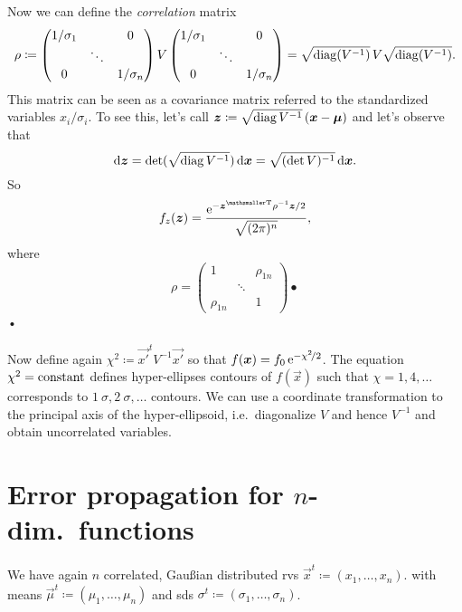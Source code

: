 Now we can define the \emph{correlation} matrix
\begin{equation}
	\rho\coloneqq 
	\begin{pmatrix}
		1/\sigma_1 & &0\\
			 &\ddots & \\
		0 & &1/\sigma_n
	\end{pmatrix}
	V
	\begin{pmatrix}
		1/\sigma_1 & &0\\
			 &\ddots & \\
		0 & &1/\sigma_n
	\end{pmatrix}
	= \sqrt{\operatorname{diag} (V^{-1}) }\, V \sqrt{\operatorname{diag} (V^{-1})}.
\end{equation}
This matrix can be seen as a covariance matrix referred to the standardized variables $x_i/\sigma_i$.
To see this, let's call $\bm{{z}} \coloneqq \sqrt{\operatorname{diag} V^{-1}}\,(\bm{{x}}-\bm{{\mu}})$ and let's observe that
\begin{equation}
	\mathop{}\!\mathrm{d}\bm{{z}} = \det(\sqrt{\operatorname{diag} V^{-1} })\mathop{}\!\mathrm{d}\bm{{x}} = \sqrt{(\det V)^{-1}}\mathop{}\!\mathrm{d} \bm{{x}}.
\end{equation}
So
\begin{equation}
	f_z(\vec{z}) = \frac{\eu^{-\transpose{\vec{z}} \rho ^{-1} \vec{z}/2}}{\sqrt{(2\pi)^n}},
\end{equation}
where
\begin{equation}
	\rho =
	\begin{pmatrix}
		1	& 	&\rho_{1n} \\
	   &\ddots{} 	 & \\
		\rho_{1n}	&  &1
	\end{pmatrix}•
\end{equation}•



Now define again $\chi^2 \coloneqq\vec{x'}^tV^{-1}\vec{x'}$ so that $f(\bm{{x}}) = f_0\,\mathrm{e}^{-\chi^2\!/2}$.
The equation $\chi^2 = \textup{constant}$ defines hyper-ellipses contours of $f(\vec{x})$ such that $\chi = 1,4,\dots$ corresponds to $\SI{1}{\sigma},\SI{2}{\sigma},\dots$ contours.
We can use a coordinate transformation to the principal axis of the hyper-ellipsoid, i.e.~diagonalize $V$ and hence $V^{-1}$ and obtain uncorrelated variables.

\section{Error propagation for $n$-dim.~functions}

We have again $n$ correlated, Gau\ss{}ian distributed \acp{rv} $\vec{x}^t \coloneqq(x_1,\dots,x_n)$. with means $\vec{\mu}^t\coloneqq (\mu_1,\dots,\mu_n)$ and \acp{sd} $\sigma^t \coloneqq (\sigma_1,\dots,\sigma_n)$.



